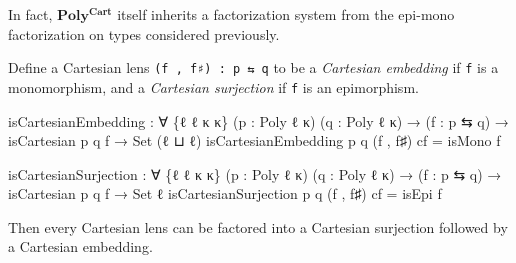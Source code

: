 \documentclass[
  11pt,
  oneside,
  article]{memoir}
\newenvironment{Shaded}{}{}
\newcommand{\DataTypeTok}[1]{\textcolor[rgb]{0.56,0.13,0.00}{#1}}
\newcommand{\NormalTok}[1]{#1}
\newcommand{\OtherTok}[1]{\textcolor[rgb]{0.00,0.44,0.13}{#1}}
\theoremstyle{definition}
\theoremstyle{plain}
\newcommand{\0}{\textsf{0}}
\newcommand{\1}{\tn{\textsf{1}}}
\begin{document}
In fact, \(\mathbf{Poly^{Cart}}\) itself inherits a factorization system
from the epi-mono factorization on types considered previously.

Define a Cartesian lens \texttt{(f\ ,\ f♯)\ :\ p\ ⇆\ q} to be a
\emph{Cartesian embedding} if \texttt{f} is a monomorphism, and a
\emph{Cartesian surjection} if \texttt{f} is an epimorphism.

\begin{Shaded}
\begin{Highlighting}[]
\NormalTok{isCartesianEmbedding }\OtherTok{:} \OtherTok{∀} \OtherTok{\{}\NormalTok{ℓ ℓ\textquotesingle{} κ κ\textquotesingle{}}\OtherTok{\}} \OtherTok{(}\NormalTok{p }\OtherTok{:}\NormalTok{ Poly ℓ κ}\OtherTok{)} \OtherTok{(}\NormalTok{q }\OtherTok{:}\NormalTok{ Poly ℓ\textquotesingle{} κ\textquotesingle{}}\OtherTok{)}
                       \OtherTok{→} \OtherTok{(}\NormalTok{f }\OtherTok{:}\NormalTok{ p ⇆ q}\OtherTok{)} \OtherTok{→}\NormalTok{ isCartesian p q f }\OtherTok{→} \DataTypeTok{Set} \OtherTok{(}\NormalTok{ℓ ⊔ ℓ\textquotesingle{}}\OtherTok{)}
\NormalTok{isCartesianEmbedding p q }\OtherTok{(}\NormalTok{f , f♯}\OtherTok{)}\NormalTok{ cf }\OtherTok{=}\NormalTok{ isMono f}

\NormalTok{isCartesianSurjection }\OtherTok{:} \OtherTok{∀} \OtherTok{\{}\NormalTok{ℓ ℓ\textquotesingle{} κ κ\textquotesingle{}}\OtherTok{\}} \OtherTok{(}\NormalTok{p }\OtherTok{:}\NormalTok{ Poly ℓ κ}\OtherTok{)} \OtherTok{(}\NormalTok{q }\OtherTok{:}\NormalTok{ Poly ℓ\textquotesingle{} κ\textquotesingle{}}\OtherTok{)}
                        \OtherTok{→} \OtherTok{(}\NormalTok{f }\OtherTok{:}\NormalTok{ p ⇆ q}\OtherTok{)} \OtherTok{→}\NormalTok{ isCartesian p q f }\OtherTok{→} \DataTypeTok{Set}\NormalTok{ ℓ\textquotesingle{}}
\NormalTok{isCartesianSurjection p q }\OtherTok{(}\NormalTok{f , f♯}\OtherTok{)}\NormalTok{ cf }\OtherTok{=}\NormalTok{ isEpi f}
\end{Highlighting}
\end{Shaded}

Then every Cartesian lens can be factored into a Cartesian surjection
followed by a Cartesian embedding.
\end{document}
